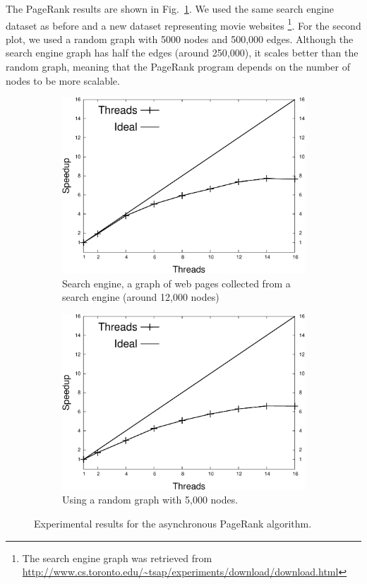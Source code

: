 The PageRank results are shown in Fig.~\ref{exp:pagerank}. We used the same search engine dataset as before and a new dataset representing movie websites \footnote{The search engine graph was retrieved from \url{http://www.cs.toronto.edu/~tsap/experiments/download/download.html}}.
For the second plot, we used a random graph with 5000 nodes and 500,000 edges. Although the search engine graph has half the edges (around 250,000), it scales better than the random graph, meaning that the PageRank program depends on the number of nodes to be more scalable.

\begin{figure}[hp]
   \centering
   \begin{subfigure}[b]{0.45\textwidth}
      \includegraphics[width=\textwidth]{new-benchmarks/speedup_pagerank-search_engines.pdf}
      \caption{Search engine, a graph of web pages collected from a search engine (around 12,000 nodes)}
   \end{subfigure}
   \begin{subfigure}[b]{0.45\textwidth}
      \includegraphics[width=\textwidth]{new-benchmarks/speedup_pagerank-5000.pdf}
      \caption{Using a random graph with 5,000 nodes.\newline}
   \end{subfigure}
   \caption{Experimental results for the asynchronous PageRank algorithm.}
   \label{exp:pagerank}
\end{figure}

